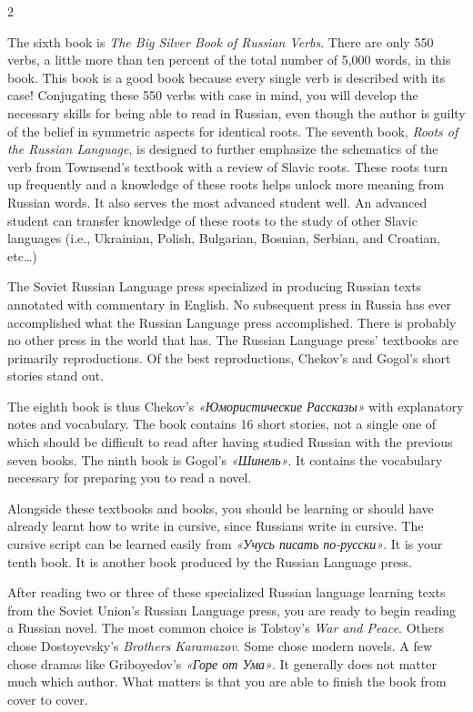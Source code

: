 \documentclass[10pt,a4paper,twoside]{article} %
\begin{document}
\begin{multicols}{2}
{\newline \indent The sixth book is \emph{The Big Silver Book of Russian Verbs}. There are only 550 verbs, a little more than ten percent of the total number of 5,000 words, in this book. This book is a good book because every single verb is described with its case! Conjugating these 550 verbs with case in mind, you will develop the necessary skills for being able to read in Russian, even though the author is guilty of the belief in symmetric aspects for identical roots. The seventh book, \emph{Roots of the Russian Language}, is designed to further emphasize the schematics of the verb from Townsend’s textbook with a review of Slavic roots. These roots turn up frequently and a knowledge of these roots helps unlock more meaning from Russian words. It also serves the most advanced student well. An advanced student can transfer knowledge of these roots to the study of other Slavic languages (i.e., Ukrainian, Polish, Bulgarian, Bosnian, Serbian, and Croatian, etc…) 

\newline \indent The Soviet Russian Language press specialized in producing Russian texts annotated with commentary in English. No subsequent press in Russia has ever accomplished what the Russian Language press accomplished. There is probably no other press in the world that has. The Russian Language press’ textbooks are primarily reproductions. Of the best reproductions, Chekov’s and Gogol’s short stories stand out.

\newline \indent The eighth book is thus Chekov’s \textrussian{\emph{«Юмористические Рассказы»}} with explanatory notes and vocabulary. The book contains 16 short stories, not a single one of which should be difficult to read after having studied Russian with the previous seven books. The ninth book is Gogol’s \textrussian{\emph{«Шинель»}}. It contains the vocabulary necessary for preparing you to read a novel. 

\newline \indent Alongside these textbooks and books, you should be learning or should have already learnt how to write in cursive, since Russians write in cursive. The cursive script can be learned easily from \textrussian{\emph{«Учусь писать по-русски»}}. It is your tenth book. It is another book produced by the Russian Language press. 

\newline \indent After reading two or three of these specialized Russian language learning texts from the Soviet Union’s Russian Language press, you are ready to begin reading a Russian novel. The most common choice is Tolstoy’s \emph{War and Peace}. Others chose Dostoyevsky’s \emph{Brothers Karamazov}. Some chose modern novels. A few chose dramas like Griboyedov’s \textrussian{\emph{«Горе от Ума»}}. It generally does not matter much which author. What matters is that you are able to finish the book from cover to cover. 

}
\end{multicols}
\end{document}
